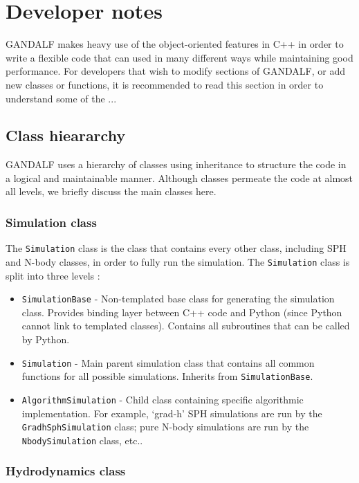 \documentclass[a4paper]{article}
\newcommand{\var}[1]{\texttt{#1}}
\begin{document}
\newpage

\section{Developer notes}
GANDALF makes heavy use of the object-oriented features in C++ in order to write a flexible code that can used in many different ways while maintaining good performance.  For developers that wish to modify sections of GANDALF, or add new classes or functions, it is recommended to read this section in order to understand some of the ...


\subsection{Class hieararchy}
GANDALF uses a hierarchy of classes using inheritance to structure the code in a logical and maintainable manner.  Although classes permeate the code at almost all levels, we briefly discuss the main classes here.

\subsubsection{Simulation class}
The \var{Simulation} class is the class that contains every other class, including SPH and N-body classes, in order to fully run the simulation.  The \var{Simulation} class is split into three levels :
\begin{itemize}
\item \var{SimulationBase} - Non-templated base class for generating the simulation class.  Provides binding layer between C++ code and Python (since Python cannot link to templated classes).  Contains all subroutines that can be called by Python.
\item \var{Simulation} - Main parent simulation class that contains all common functions for all possible simulations.  Inherits from \var{SimulationBase}.
\item \var{AlgorithmSimulation} - Child class containing specific algorithmic implementation.  For example, `grad-h' SPH simulations are run by the \var{GradhSphSimulation} class; pure N-body simulations are run by the \var{NbodySimulation} class, etc..
\end{itemize}

\subsubsection{Hydrodynamics class}
\end{document}

